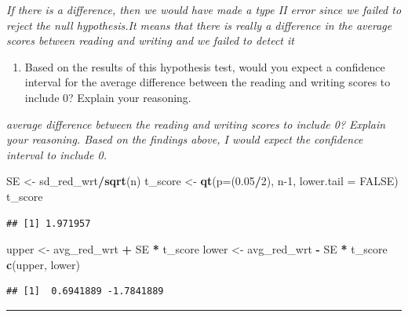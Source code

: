 \documentclass[]{article}
\newenvironment{Shaded}{\begin{snugshade}}{\end{snugshade}}
\newcommand{\DataTypeTok}[1]{\textcolor[rgb]{0.13,0.29,0.53}{#1}}
\newcommand{\DecValTok}[1]{\textcolor[rgb]{0.00,0.00,0.81}{#1}}
\newcommand{\FloatTok}[1]{\textcolor[rgb]{0.00,0.00,0.81}{#1}}
\newcommand{\KeywordTok}[1]{\textcolor[rgb]{0.13,0.29,0.53}{\textbf{#1}}}
\newcommand{\NormalTok}[1]{#1}
\newcommand{\OperatorTok}[1]{\textcolor[rgb]{0.81,0.36,0.00}{\textbf{#1}}}
\newcommand{\OtherTok}[1]{\textcolor[rgb]{0.56,0.35,0.01}{#1}}
\newcommand{\StringTok}[1]{\textcolor[rgb]{0.31,0.60,0.02}{#1}}
\providecommand{\tightlist}{%
  \setlength{\itemsep}{0pt}\setlength{\parskip}{0pt}}
\begin{document}
\emph{If there is a difference, then we would have made a type II error
since we failed to reject the null hypothesis.It means that there is
really a difference in the average scores between reading and writing
and we failed to detect it}

\begin{enumerate}
\def\labelenumi{(\alph{enumi})}
\setcounter{enumi}{6}
\tightlist
\item
  Based on the results of this hypothesis test, would you expect a
  confidence interval for the average difference between the reading and
  writing scores to include 0? Explain your reasoning.
\end{enumerate}

\emph{average difference between the reading and writing scores to
include 0? Explain your reasoning. Based on the findings above, I would
expect the confidence interval to include 0.}

\begin{Shaded}
\begin{Highlighting}[]
\NormalTok{SE <-}\StringTok{ }\NormalTok{sd_red_wrt}\OperatorTok{/}\KeywordTok{sqrt}\NormalTok{(n)}
\NormalTok{t_score <-}\StringTok{ }\KeywordTok{qt}\NormalTok{(}\DataTypeTok{p=}\NormalTok{(}\FloatTok{0.05}\OperatorTok{/}\DecValTok{2}\NormalTok{), n}\DecValTok{-1}\NormalTok{, }\DataTypeTok{lower.tail =} \OtherTok{FALSE}\NormalTok{)}
\NormalTok{t_score}
\end{Highlighting}
\end{Shaded}

\begin{verbatim}
## [1] 1.971957
\end{verbatim}

\begin{Shaded}
\begin{Highlighting}[]
\NormalTok{upper <-}\StringTok{ }\NormalTok{avg_red_wrt }\OperatorTok{+}\StringTok{ }\NormalTok{SE }\OperatorTok{*}\StringTok{ }\NormalTok{t_score}
\NormalTok{lower <-}\StringTok{ }\NormalTok{avg_red_wrt }\OperatorTok{-}\StringTok{ }\NormalTok{SE }\OperatorTok{*}\StringTok{ }\NormalTok{t_score}
\KeywordTok{c}\NormalTok{(upper, lower)}
\end{Highlighting}
\end{Shaded}

\begin{verbatim}
## [1]  0.6941889 -1.7841889
\end{verbatim}

\begin{center}\rule{0.5\linewidth}{\linethickness}\end{center}
\end{document}
